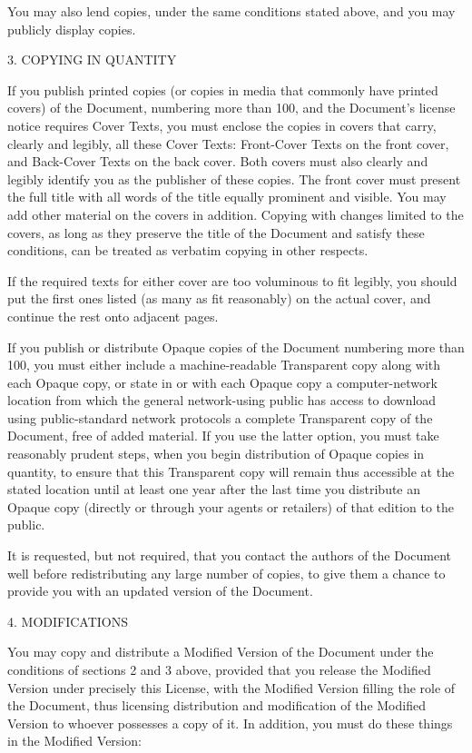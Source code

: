 \documentclass[oneside,english,a4paper,10pt,oneside,openany,final]{memoir}
\begin{document}
You may also lend copies, under the same conditions stated above, and you may publicly display copies.

3. COPYING IN QUANTITY

If you publish printed copies (or copies in media that commonly have printed covers) of the Document, numbering more than 100, and the Document's license notice requires Cover Texts, you must enclose the copies in covers that carry, clearly and legibly, all these Cover Texts: Front-Cover Texts on the front cover, and Back-Cover Texts on the back cover. Both covers must also clearly and legibly identify you as the publisher of these copies. The front cover must present the full title with all words of the title equally prominent and visible. You may add other material on the covers in addition. Copying with changes limited to the covers, as long as they preserve the title of the Document and satisfy these conditions, can be treated as verbatim copying in other respects.

If the required texts for either cover are too voluminous to fit legibly, you should put the first ones listed (as many as fit reasonably) on the actual cover, and continue the rest onto adjacent pages.

If you publish or distribute Opaque copies of the Document numbering more than 100, you must either include a machine-readable Transparent copy along with each Opaque copy, or state in or with each Opaque copy a computer-network location from which the general network-using public has access to download using public-standard network protocols a complete Transparent copy of the Document, free of added material. If you use the latter option, you must take reasonably prudent steps, when you begin distribution of Opaque copies in quantity, to ensure that this Transparent copy will remain thus accessible at the stated location until at least one year after the last time you distribute an Opaque copy (directly or through your agents or retailers) of that edition to the public.

It is requested, but not required, that you contact the authors of the Document well before redistributing any large number of copies, to give them a chance to provide you with an updated version of the Document.

4. MODIFICATIONS

You may copy and distribute a Modified Version of the Document under the conditions of sections 2 and 3 above, provided that you release the Modified Version under precisely this License, with the Modified Version filling the role of the Document, thus licensing distribution and modification of the Modified Version to whoever possesses a copy of it. In addition, you must do these things in the Modified Version:
\end{document}
